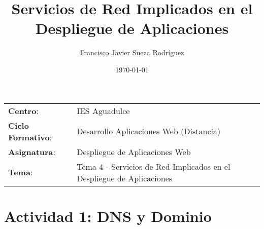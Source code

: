 


\title{
\vspace{10ex}
\normalfont \normalsize
\huge \textbf{Servicios de Red Implicados en el Despliegue de Aplicaciones}
}
\author{Francisco Javier Sueza Rodríguez}
\date{\normalsize\today}




\maketitle

\thispagestyle{empty}

\vspace{65ex}

\begin{center}
    \begin{tabular}{l l}
        \textbf{Centro}: & IES Aguadulce \\
        \textbf{Ciclo Formativo}: & Desarrollo Aplicaciones Web (Distancia)\\
        \textbf{Asignatura}: & Despliegue de Aplicaciones Web\\
        \textbf{Tema}: & Tema 4 - Servicios de Red Implicados en el Despliegue de Aplicaciones\\
    \end{tabular}
\end{center}

\newpage

\tableofcontents

\newpage

\listoffigures

\newpage

\section{Actividad 1: DNS y Dominio}

